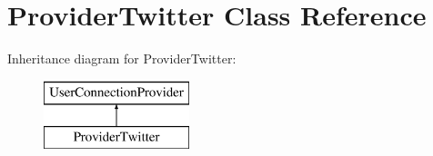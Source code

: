 \hypertarget{class_provider_twitter}{\section{Provider\-Twitter Class Reference}
\label{class_provider_twitter}
}
Inheritance diagram for Provider\-Twitter\-:\begin{figure}[H]
\begin{center}
\leavevmode
\includegraphics[height=2.000000cm]{class_provider_twitter}
\end{center}
\end{figure}
